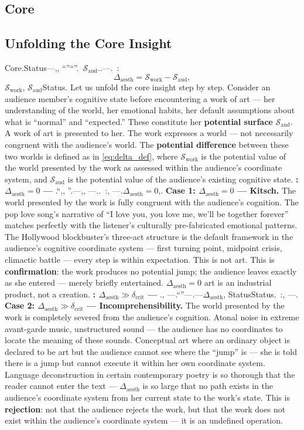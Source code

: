 \documentclass[12pt,a4paper]{article}
\theoremstyle{remark}
\newcommand{\Sstates}{\mathcal{S}}
\newcommand{\AesthDelta}{\Delta_{\text{aesth}}}
\newcommand{\CritDelta}{\delta_{\text{crit}}}
\begin{document}
\subsection{Core}
\subsection{Unfolding the Core Insight}
Core.Status---,, ``''``''.\  $\Sstates_{\text{aud}}$..---.\ : 
\begin{equation}\label{eq:delta_def}
 \AesthDelta = \Sstates_{\text{work}} - \Sstates_{\text{aud}},
\end{equation}
$\Sstates_{\text{work}}$, $\Sstates_{\text{aud}}$Status.
Let us unfold the core insight step by step. Consider an audience member's cognitive state before encountering a work of art --- her understanding of the world, her emotional habits, her default assumptions about what is ``normal'' and ``expected.'' These constitute her \textbf{potential surface} $\Sstates_{\text{aud}}$. A work of art is presented to her. The work expresses a world --- not necessarily congruent with the audience's world. The \textbf{potential difference} between these two worlds is defined as in \eqref{eq:delta_def}, where $\Sstates_{\text{work}}$ is the potential value of the world presented by the work as assessed within the audience's coordinate system, and $\Sstates_{\text{aud}}$ is the potential value of the audience's existing cognitive state.
\noindent\textbf{: $\AesthDelta = 0$ ---}
.``,, ''.---,, ---..\ :, ---.$\AesthDelta = 0$,.
\textbf{Case 1: $\AesthDelta = 0$ --- Kitsch.}
The world presented by the work is fully congruent with the audience's cognition. The pop love song's narrative of ``I love you, you love me, we'll be together forever'' matches perfectly with the listener's culturally pre-fabricated emotional patterns. The Hollywood blockbuster's three-act structure is the default framework in the audience's cognitive coordinate system --- first turning point, midpoint crisis, climactic battle --- every step is within expectation. This is not art. This is \textbf{confirmation}: the work produces no potential jump; the audience leaves exactly as she entered --- merely briefly entertained. $\AesthDelta = 0$ art is an industrial product, not a creation.
\noindent\textbf{: $\AesthDelta \gg \CritDelta$ ---}
., ---.``''---.---$\AesthDelta$, StatusStatus.\ :, ---.
\textbf{Case 2: $\AesthDelta \gg \CritDelta$ --- Incomprehensibility.}
The world presented by the work is completely severed from the audience's cognition. Atonal noise in extreme avant-garde music, unstructured sound --- the audience has no coordinates to locate the meaning of these sounds. Conceptual art where an ordinary object is declared to be art but the audience cannot see where the ``jump'' is --- she is told there is a jump but cannot execute it within her own coordinate system. Language deconstruction in certain contemporary poetry is so thorough that the reader cannot enter the text --- $\AesthDelta$ is so large that no path exists in the audience's coordinate system from her current state to the work's state. This is \textbf{rejection}: not that the audience rejects the work, but that the work does not exist within the audience's coordinate system --- it is an undefined operation.
\end{document}
